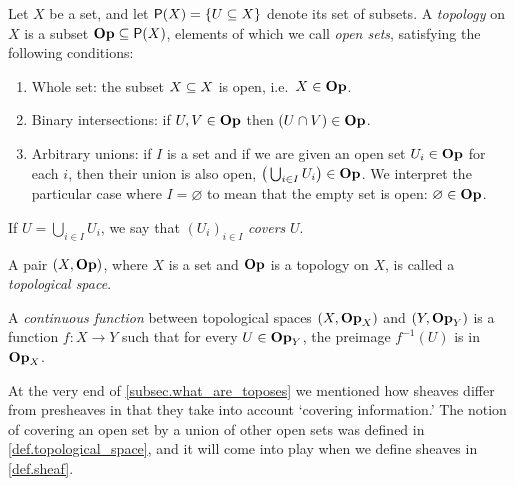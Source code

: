 \documentclass[7Sketches]{subfiles}
\begin{document}
\begin{definition}%
\label{def.topological_space}%
%
  Let $X$ be a set, and let $\powset(X)=\{U\ss X\}$ denote its set of subsets. A
  \emph{topology} on $X$ is a subset $\Op\ss\powset(X)$, elements of which we call \emph{open sets},%
  satisfying the following conditions:
  \begin{enumerate}[label=(\alph*)]
  	\item Whole set: the subset $X\ss X$ is open, i.e.\ $X\in\Op$.
  	\item Binary intersections: if $U,V\in\Op$ then $(U\cap V)\in\Op$.
	\item Arbitrary unions: if $I$ is a set and if we are given an open set
	  $U_i\in\Op$ for each $i$, then their union is also open,
	  $\big(\bigcup_{i\in I}U_i\big)\in\Op$. We interpret the particular
	  case where $I=\varnothing$ to mean that the empty set is open:
	  $\varnothing\in\Op$. 
  \end{enumerate}
  If $U=\bigcup_{i\in I}U_i$, we say that $(U_i)_{i\in I}$ \emph{covers} $U$.

  A pair $(X,\Op)$, where $X$ is a set and $\Op$ is a topology on $X$, is called a \emph{topological space}.%

  
  A \emph{continuous function} between topological spaces $(X,\Op_X)$ and
  $(Y,\Op_Y)$ is a function $f\colon X\to Y$ such that for every $U\in\Op_Y$,
  the preimage $f^{-1}(U)$ is in $\Op_X$. %
%
\end{definition}

At the very end of \cref{subsec.what_are_toposes} we mentioned how sheaves differ from presheaves in that they take into account `covering information.' The notion of covering an open set by a union of other open sets was defined in \cref{def.topological_space}, and it will come into play when we define sheaves in \cref{def.sheaf}.
\end{document}
